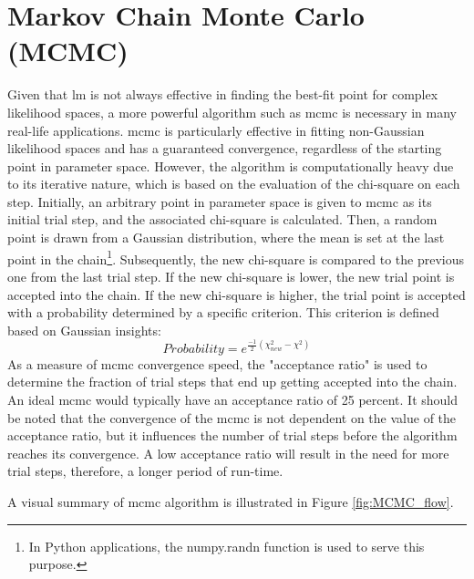 \documentclass[12pt, TexShade, letterpaper]{report}
\begin{document}
\section{Markov Chain Monte Carlo (MCMC)}
Given that \gls{lm} is not always effective in finding the best-fit point for complex likelihood spaces, a more powerful algorithm such as \gls{mcmc} is necessary in many real-life applications. \gls{mcmc} is particularly effective in fitting non-Gaussian likelihood spaces and has a guaranteed convergence, regardless of the starting point in parameter space. However, the algorithm is computationally heavy due to its iterative nature, which is based on the evaluation of the chi-square on each step. Initially, an arbitrary point in parameter space is given to \gls{mcmc} as its initial trial step, and the associated chi-square is calculated. Then, a random point is drawn from a Gaussian distribution, where the mean is set at the last point in the chain\footnote{In Python applications, the numpy.randn function is used to serve this purpose.}. Subsequently, the new chi-square is compared to the previous one from the last trial step. If the new chi-square is lower, the new trial point is accepted into the chain. If the new chi-square is higher, the trial point is accepted with a probability determined by a specific criterion. This criterion is defined based on Gaussian insights:
\begin{equation}
    Probability = e^{\frac{-1}{2}\left(\chi_{new}^2 - \chi^2\right)} 
    \label{eq:mcmc_probability}
\end{equation}
As a measure of \gls{mcmc} convergence speed, the "acceptance ratio" is used to determine the fraction of trial steps that end up getting accepted into the chain. An ideal \gls{mcmc} would typically have an acceptance ratio of 25 percent. It should be noted that the convergence of the \gls{mcmc} is not dependent on the value of the acceptance ratio, but it influences the number of trial steps before the algorithm reaches its convergence. A low acceptance ratio will result in the need for more trial steps, therefore, a longer period of run-time.\par
A visual summary of \gls{mcmc} algorithm is illustrated in Figure \ref{fig:MCMC_flow}.
\end{document}
